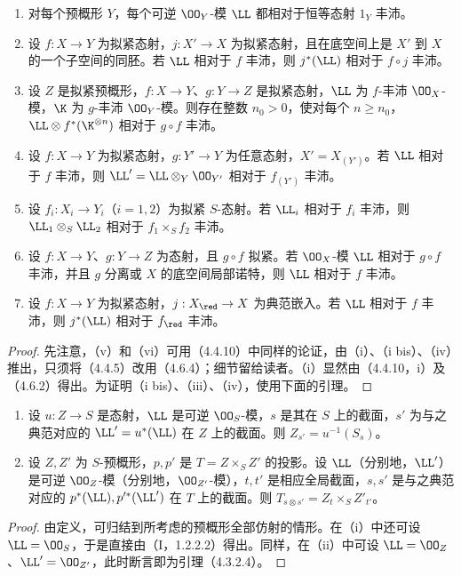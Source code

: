 \begin{enumerate}[label=\textup{(\roman*)}]
\item 对每个预概形 $Y$，每个可逆 $\OO_Y$-模 $\LL$ 都相对于恒等态射 $1_Y$ 丰沛。
\item[\textup{(i bis)}] 设 $f:X\to Y$ 为拟紧态射，$j:X'\to X$ 为拟紧态射，且在底空间上是 $X'$ 到 $X$ 的一个子空间的同胚。若 $\LL$ 相对于 $f$ 丰沛，则 $j^*(\LL)$ 相对于 $f\circ j$ 丰沛。
\item 设 $Z$ 是拟紧预概形，$f:X\to Y$、$g:Y\to Z$ 是拟紧态射，$\LL$ 为 $f$-丰沛 $\OO_X$-模，$\K$ 为 $g$-丰沛 $\OO_Y$-模。则存在整数 $n_0>0$，使对每个 $n\geq n_0$，$\LL\otimes f^*(\K^{\otimes n})$ 相对于 $g\circ f$ 丰沛。
\item 设 $f:X\to Y$ 为拟紧态射，$g:Y'\to Y$ 为任意态射，$X'=X_{(Y')}$。若 $\LL$ 相对于 $f$ 丰沛，则 $\LL'=\LL\otimes_Y\OO_{Y'}$ 相对于 $f_{(Y')}$ 丰沛。
\item 设 $f_i:X_i\to Y_i$（$i=1,2$）为拟紧 $S$-态射。若 $\LL_i$ 相对于 $f_i$ 丰沛，则 $\LL_1\otimes_S\LL_2$ 相对于 $f_1\times_S f_2$ 丰沛。
\item 设 $f:X\to Y$、$g:Y\to Z$ 为态射，且 $g\circ f$ 拟紧。若 $\OO_X$-模 $\LL$ 相对于 $g\circ f$ 丰沛，并且 $g$ 分离或 $X$ 的底空间局部诺特，则 $\LL$ 相对于 $f$ 丰沛。
\item 设 $f:X\to Y$ 为拟紧态射，$j:X_{\red}\to X$ 为典范嵌入。若 $\LL$ 相对于 $f$ 丰沛，则 $j^*(\LL)$ 相对于 $f_{\red}$ 丰沛。
\end{enumerate}
\begin{proof}
先注意，（v）和（vi）可用（4.4.10）中同样的论证，由（i）、（i bis）、（iv）推出，只须将（4.4.5）改用（4.6.4）；细节留给读者。（i）显然由（4.4.10，i）及（4.6.2）得出。为证明（i bis）、（iii）、（iv），使用下面的引理。\renewcommand{\qedsymbol}{}
\end{proof}

\begin{enumerate}[label=\textup{(\roman*)}]
\item 设 $u:Z\to S$ 是态射，$\LL$ 是可逆 $\OO_S$-模，$s$ 是其在 $S$ 上的截面，$s'$ 为与之典范对应的 $\LL'=u^*(\LL)$ 在 $Z$ 上的截面。则 $Z_{s'}=u^{-1}(S_s)$。
\item 设 $Z,Z'$ 为 $S$-预概形，$p,p'$ 是 $T=Z\times_S Z'$ 的投影。设 $\LL$（分别地，$\LL'$）是可逆 $\OO_Z$-模（分别地，$\OO_{Z'}$-模），$t,t'$ 是相应全局截面，$s,s'$ 是与之典范对应的 $p^*(\LL),p'^*(\LL')$ 在 $T$ 上的截面。则 $T_{s\otimes s'}=Z_t\times_S Z'_{t'}$。
\end{enumerate}
\begin{proof}
由定义，可归结到所考虑的预概形全部仿射的情形。在（i）中还可设 $\LL=\OO_S$，于是直接由（I，1.2.2.2）得出。同样，在（ii）中可设 $\LL=\OO_Z$、$\LL'=\OO_{Z'}$，此时断言即为引理（4.3.2.4）。
\end{proof}

